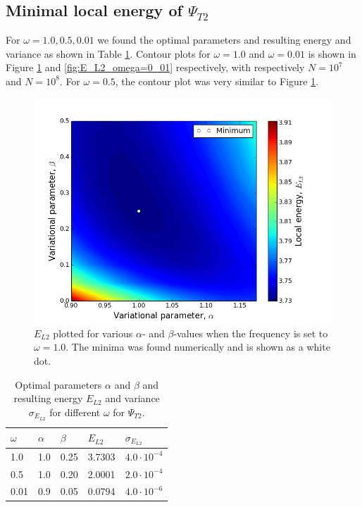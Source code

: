 \documentclass[norsk,a4paper,12pt]{article}
\begin{document}
\subsection{Minimal local energy of $\Psi_{T2}$}
For $\omega = 1.0, 0.5, 0.01$ we found the optimal parameters and resulting energy and variance as shown in Table \ref{tab:Psi2results}. Contour plots for $\omega = 1.0$ and $\omega =0.01$ is shown in Figure \ref{fig:E_L2_omega=1_0} and \ref{fig:E_L2_omega=0_01} respectively, with respectively $N=10^7$ and $N=10^8$. For $\omega = 0.5$, the contour plot was very similar to Figure \ref{fig:E_L2_omega=1_0}. 
\begin{figure} [H]
    \centering
    \includegraphics[width=12cm]{E_L2_contour_omega=1_0.png}
    \caption{$E_{L2}$ plotted for various $\alpha$- and $\beta$-values when the frequency is set to $\omega=1.0$. The minima was found numerically and is shown as a white dot.}
    \label{fig:E_L2_omega=1_0}
\end{figure}

\begin{table} [H]
\centering
\caption{Optimal parameters $\alpha$ and $\beta$ and resulting energy $E_{L2}$ and variance $\sigma_{E_{L2}}$ for different $\omega$ for $\Psi_{T2}$.}
\begin{tabularx}{\textwidth}{XXXXX} \hline
\label{tab:Psi2results}
$\omega$ & $\alpha$ & $\beta$ & $E_{L2}$ & $\sigma_{E_{L2}}$ \\ \hline
1.0 & 1.0 & 0.25 & 3.7303 & $4.0\cdot 10^{-4}$ \\
0.5 & 1.0 & 0.20 & 2.0001 & $2.0\cdot 10^{-4}$ \\
0.01 & 0.9 & 0.05 & 0.0794 & $4.0\cdot 10^{-6}$ \\ \hline
\end{tabularx}
\end{table}
\end{document}
